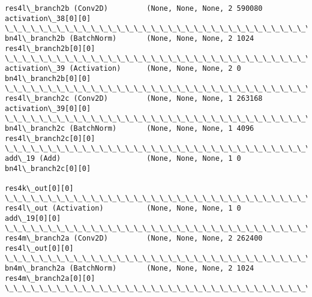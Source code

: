 \documentclass[11pt]{article}
\begin{document}
\begin{Verbatim}[commandchars=\\\{\}]
res4l\_branch2b (Conv2D)         (None, None, None, 2 590080      activation\_38[0][0]              
\_\_\_\_\_\_\_\_\_\_\_\_\_\_\_\_\_\_\_\_\_\_\_\_\_\_\_\_\_\_\_\_\_\_\_\_\_\_\_\_\_\_\_\_\_\_\_\_\_\_\_\_\_\_\_\_\_\_\_\_\_\_\_\_\_\_\_\_\_\_\_\_\_\_\_\_\_\_\_\_\_\_\_\_\_\_\_\_\_\_\_\_\_\_\_\_\_\_
bn4l\_branch2b (BatchNorm)       (None, None, None, 2 1024        res4l\_branch2b[0][0]             
\_\_\_\_\_\_\_\_\_\_\_\_\_\_\_\_\_\_\_\_\_\_\_\_\_\_\_\_\_\_\_\_\_\_\_\_\_\_\_\_\_\_\_\_\_\_\_\_\_\_\_\_\_\_\_\_\_\_\_\_\_\_\_\_\_\_\_\_\_\_\_\_\_\_\_\_\_\_\_\_\_\_\_\_\_\_\_\_\_\_\_\_\_\_\_\_\_\_
activation\_39 (Activation)      (None, None, None, 2 0           bn4l\_branch2b[0][0]              
\_\_\_\_\_\_\_\_\_\_\_\_\_\_\_\_\_\_\_\_\_\_\_\_\_\_\_\_\_\_\_\_\_\_\_\_\_\_\_\_\_\_\_\_\_\_\_\_\_\_\_\_\_\_\_\_\_\_\_\_\_\_\_\_\_\_\_\_\_\_\_\_\_\_\_\_\_\_\_\_\_\_\_\_\_\_\_\_\_\_\_\_\_\_\_\_\_\_
res4l\_branch2c (Conv2D)         (None, None, None, 1 263168      activation\_39[0][0]              
\_\_\_\_\_\_\_\_\_\_\_\_\_\_\_\_\_\_\_\_\_\_\_\_\_\_\_\_\_\_\_\_\_\_\_\_\_\_\_\_\_\_\_\_\_\_\_\_\_\_\_\_\_\_\_\_\_\_\_\_\_\_\_\_\_\_\_\_\_\_\_\_\_\_\_\_\_\_\_\_\_\_\_\_\_\_\_\_\_\_\_\_\_\_\_\_\_\_
bn4l\_branch2c (BatchNorm)       (None, None, None, 1 4096        res4l\_branch2c[0][0]             
\_\_\_\_\_\_\_\_\_\_\_\_\_\_\_\_\_\_\_\_\_\_\_\_\_\_\_\_\_\_\_\_\_\_\_\_\_\_\_\_\_\_\_\_\_\_\_\_\_\_\_\_\_\_\_\_\_\_\_\_\_\_\_\_\_\_\_\_\_\_\_\_\_\_\_\_\_\_\_\_\_\_\_\_\_\_\_\_\_\_\_\_\_\_\_\_\_\_
add\_19 (Add)                    (None, None, None, 1 0           bn4l\_branch2c[0][0]              
                                                                 res4k\_out[0][0]                  
\_\_\_\_\_\_\_\_\_\_\_\_\_\_\_\_\_\_\_\_\_\_\_\_\_\_\_\_\_\_\_\_\_\_\_\_\_\_\_\_\_\_\_\_\_\_\_\_\_\_\_\_\_\_\_\_\_\_\_\_\_\_\_\_\_\_\_\_\_\_\_\_\_\_\_\_\_\_\_\_\_\_\_\_\_\_\_\_\_\_\_\_\_\_\_\_\_\_
res4l\_out (Activation)          (None, None, None, 1 0           add\_19[0][0]                     
\_\_\_\_\_\_\_\_\_\_\_\_\_\_\_\_\_\_\_\_\_\_\_\_\_\_\_\_\_\_\_\_\_\_\_\_\_\_\_\_\_\_\_\_\_\_\_\_\_\_\_\_\_\_\_\_\_\_\_\_\_\_\_\_\_\_\_\_\_\_\_\_\_\_\_\_\_\_\_\_\_\_\_\_\_\_\_\_\_\_\_\_\_\_\_\_\_\_
res4m\_branch2a (Conv2D)         (None, None, None, 2 262400      res4l\_out[0][0]                  
\_\_\_\_\_\_\_\_\_\_\_\_\_\_\_\_\_\_\_\_\_\_\_\_\_\_\_\_\_\_\_\_\_\_\_\_\_\_\_\_\_\_\_\_\_\_\_\_\_\_\_\_\_\_\_\_\_\_\_\_\_\_\_\_\_\_\_\_\_\_\_\_\_\_\_\_\_\_\_\_\_\_\_\_\_\_\_\_\_\_\_\_\_\_\_\_\_\_
bn4m\_branch2a (BatchNorm)       (None, None, None, 2 1024        res4m\_branch2a[0][0]             
\_\_\_\_\_\_\_\_\_\_\_\_\_\_\_\_\_\_\_\_\_\_\_\_\_\_\_\_\_\_\_\_\_\_\_\_\_\_\_\_\_\_\_\_\_\_\_\_\_\_\_\_\_\_\_\_\_\_\_\_\_\_\_\_\_\_\_\_\_\_\_\_\_\_\_\_\_\_\_\_\_\_\_\_\_\_\_\_\_\_\_\_\_\_\_\_\_\_

\end{Verbatim}
\end{document}
